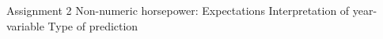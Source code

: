 \documentclass[8pt]{beamer}
\begin{document}
    \begin{frame}{Assignment 2}
        Non-numeric horsepower: Expectations
        Interpretation of year-variable
        Type of prediction

\end{frame}
\end{document}
